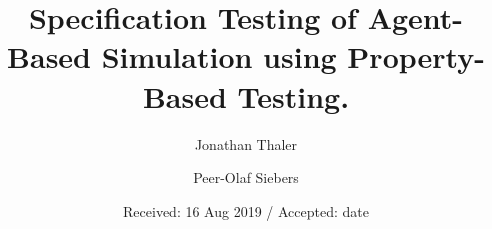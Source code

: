 \documentclass{svjour3}                     %
\begin{document}
\title{Specification Testing of Agent-Based Simulation using Property-Based Testing.
}


\author{Jonathan Thaler         \and
        Peer-Olaf Siebers %
}



\date{Received: 16 Aug 2019 / Accepted: date}

\maketitle
\end{document}

